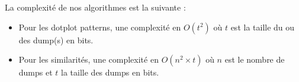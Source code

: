 La complexité de nos algorithmes est la suivante :

\begin{itemize}
  \item Pour les dotplot patterns, une complexité en $O(t^{2})$ où $t$ est la taille du ou des dump(s) en bits.
  \item Pour les similarités, une complexité en $O(n^{2}\times t)$ où $n$ est le nombre de dumps et $t$ la taille des dumps en bits.
\end{itemize}
